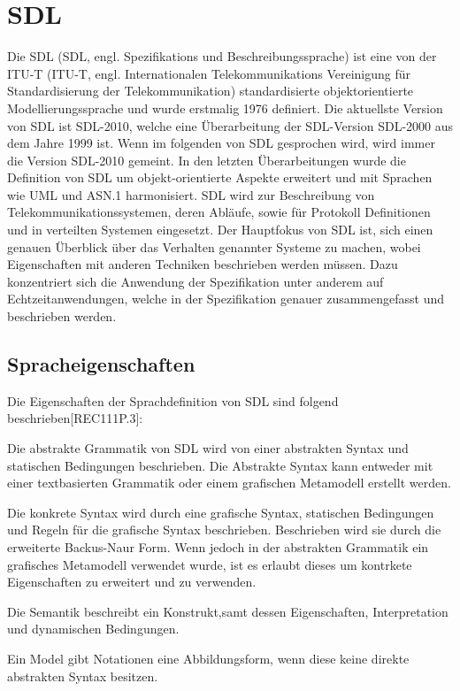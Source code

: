 \section{\acf{SDL}}
\label{sc:SDL}
Die \ac{SDL} (SDL, engl. Spezifikations und Beschreibungssprache) ist eine von der \ac{ITU-T} (ITU-T, engl. Internationalen 
Telekommunikations Vereinigung für Standardisierung der Telekommunikation) standardisierte objektorientierte Modellierungssprache und wurde erstmalig 
1976 definiert. Die aktuellste Version von \ac{SDL} ist SDL-2010, welche eine Überarbeitung der SDL-Version SDL-2000 aus dem Jahre 
1999 ist. Wenn im folgenden von \ac{SDL} gesprochen wird, wird immer die Version \acs{SDL}-2010 gemeint. In den letzten 
Überarbeitungen wurde die Definition von \ac{SDL} um objekt-orientierte Aspekte erweitert und mit Sprachen wie UML und ASN.1 
harmonisiert. \ac{SDL} wird zur Beschreibung von Telekommunikationssystemen, deren Abläufe, sowie für Protokoll Definitionen 
und in verteilten Systemen eingesetzt. Der Hauptfokus von \ac{SDL} ist, sich einen genauen Überblick über das Verhalten genannter 
Systeme zu machen, wobei Eigenschaften mit anderen Techniken beschrieben werden müssen. Dazu konzentriert sich die Anwendung der 
Spezifikation unter anderem auf Echtzeitanwendungen, welche in der Spezifikation genauer zusammengefasst und beschrieben werden.

\subsection{Spracheigenschaften}
\label{ssc:Spracheigenschaften}
Die Eigenschaften der Sprachdefinition von \ac{SDL} sind folgend beschrieben[REC111P.3]:
\begin{itemize}{
\item[Abstrakte Grammatik] Die abstrakte Grammatik von \ac{SDL} wird von einer abstrakten Syntax und  statischen Bedingungen 
beschrieben. Die Abstrakte Syntax kann entweder mit einer textbasierten Grammatik oder einem grafischen Metamodell erstellt werden.

\item[Konkrete Grammatik] Die konkrete Syntax wird durch eine grafische Syntax, statischen Bedingungen und Regeln für die grafische Syntax beschrieben.
Beschrieben wird sie durch die erweiterte Backus-Naur Form. Wenn jedoch in der abstrakten Grammatik ein 
grafisches Metamodell verwendet wurde, ist es erlaubt dieses um kontrkete Eigenschaften zu erweitert und zu verwenden.

\item[Semantik] Die Semantik beschreibt ein Konstrukt,samt dessen Eigenschaften, Interpretation und dynamischen Bedingungen.

\item[Model] Ein Model gibt Notationen eine Abbildungsform, wenn diese keine direkte abstrakten Syntax besitzen.
}\end{itemize}

